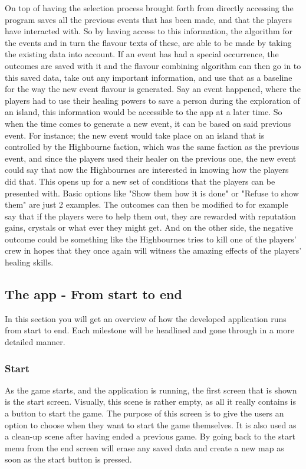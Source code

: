 On top of having the selection process brought forth from directly accessing the program saves all the previous events that has been made, and that the players have interacted with. So by having access to this information, the algorithm for the events and in turn the flavour texts of these, are able to be made by taking the existing data into account. If an event has had a special occurrence, the outcomes are saved with it and the flavour combining algorithm can then go in to this saved data, take out any important information, and use that as a baseline for the way the new event flavour is generated. Say an event happened, where the players had to use their healing powers to save a person during the exploration of an island, this information would be accessible to the app at a later time. So when the time comes to generate a new event, it can be based on said previous event. For instance; the new event would take place on an island that is controlled by the Highbourne faction, which was the same faction as the previous event, and since the players used their healer on the previous one, the new event could say that now the Highbournes are interested in knowing how the players did that. This opens up for a new set of conditions that the players can be presented with. Basic options like "Show them how it is done" or "Refuse to show them" are just 2 examples. The outcomes can then be modified to for example say that if the players were to help them out, they are rewarded with reputation gains, crystals or what ever they might get. And on the other side, the negative outcome could be something like the Highbournes tries to kill one of the players' crew in hopes that they once again will witness the amazing effects of the players' healing skills.


\subsection{The app - From start to end}
In this section you will get an overview of how the developed application runs from start to end. Each milestone will be headlined and gone through in a more detailed manner.

\subsubsection{Start}
As the game starts, and the application is running, the first screen that is shown is the start screen. Visually, this scene is rather empty, as all it really contains is a button to start the game. The purpose of this screen is to give the users an option to choose when they want to start the game themselves. It is also used as a clean-up scene after having ended a previous game. By going back to the start menu from the end screen will erase any saved data and create a new map as soon as the start button is pressed.

